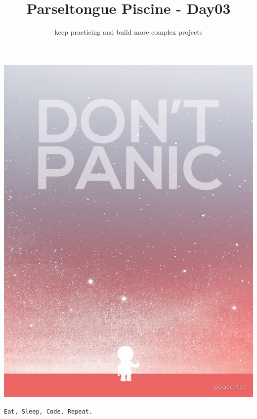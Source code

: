 \documentclass{42-en}
\begin{document}
\title{Parseltongue Piscine - Day03}
\subtitle{keep practicing and build more complex projects}


\maketitle

\tableofcontents


\newpage

\bigskip

\centerline{\includegraphics[width=150mm]{images/dont_panic.jpeg}}

\centerline{\texttt{Eat, Sleep, Code, Repeat.}}

\end{document}
